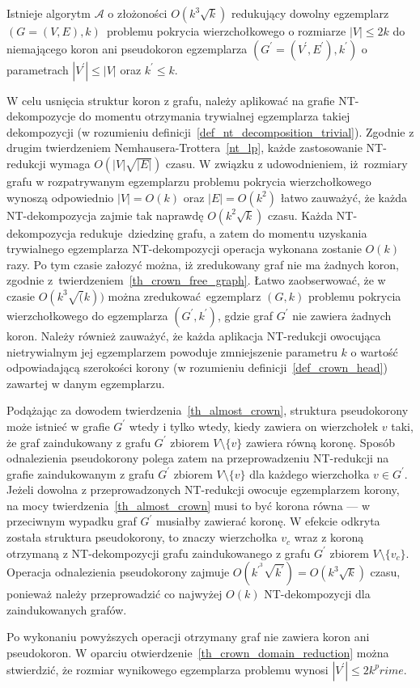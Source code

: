 {  \begin{theorem}
    Istnieje algorytm $\mathcal{A}$ o złożoności $O(k^3\sqrt{k})$ redukujący dowolny egzemplarz $(G=(V, E), k)$ problemu pokrycia wierzchołkowego o rozmiarze $|V|\leq 2k$ do niemającego koron ani pseudokoron egzemplarza $(G^\prime=(V^\prime, E^\prime), k^\prime)$ o parametrach $|V^\prime| \leq |V|$ oraz $k^\prime \leq k$.
  \end{theorem}
  \begin{bproof}
    W celu usnięcia struktur koron z grafu, należy aplikować na grafie NT-dekompozycje do momentu otrzymania trywialnej egzemplarza takiej dekompozycji (w rozumieniu definicji~\ref{def_nt_decomposition_trivial}).
    Zgodnie z drugim twierdzeniem Nemhausera-Trottera~\ref{nt_lp}, każde zastosowanie NT-redukcji wymaga $O(|V|\sqrt{|E|})$ czasu.
    W związku z udowodnieniem, iż rozmiary grafu w rozpatrywanym egzemplarzu problemu pokrycia wierzchołkowego wynoszą odpowiednio $|V|=O(k)$ oraz $|E|=O(k^2)$ łatwo zauważyć, że każda NT-dekompozycja zajmie tak naprawdę $O(k^2\sqrt{k})$ czasu.
    Każda NT-dekompozycja redukuje dziedzinę grafu, a zatem do momentu uzyskania trywialnego egzemplarza NT-dekompozycji operacja wykonana zostanie $O(k)$ razy.
    Po tym czasie załozyć można, iż zredukowany graf nie ma żadnych koron, zgodnie z~twierdzeniem~\ref{th_crown_free_graph}.
    Łatwo zaobserwować, że w czasie $O(k^3\sqrt(k))$ można zredukować egzemplarz $(G, k)$ problemu pokrycia wierzchołkowego do egzemplarza $(G^\prime, k^\prime)$, gdzie graf $G^\prime$ nie zawiera żadnych koron.
    Należy również zauważyć, że każda aplikacja NT-redukcji owocująca nietrywialnym jej egzemplarzem powoduje zmniejszenie parametru $k$ o wartość odpowiadającą szerokości korony (w rozumieniu definicji~\ref{def_crown_head}) zawartej w danym egzemplarzu.

    Podążając za dowodem twierdzenia~\ref{th_almost_crown}, struktura pseudokorony może istnieć w grafie $G^\prime$ wtedy i tylko wtedy, kiedy zawiera on wierzchołek $v$ taki, że graf zaindukowany z grafu $G^\prime$ zbiorem $V \setminus \{v\}$ zawiera równą koronę.
    Sposób odnalezienia pseudokorony polega zatem na przeprowadzeniu NT-redukcji na grafie zaindukowanym z grafu $G^\prime$ zbiorem $V \setminus \{v\}$ dla każdego wierzchołka $v \in G^\prime$.
    Jeżeli dowolna z przeprowadzonych NT-redukcji owocuje egzemplarzem korony, na mocy twierdzenia~\ref{th_almost_crown} musi to być korona równa --- w przeciwnym wypadku graf $G^\prime$ musiałby zawierać koronę.
    W efekcie odkryta została struktura pseudokorony, to znaczy wierzchołka $v_c$ wraz z koroną otrzymaną z NT-dekompozycji grafu zaindukowanego z grafu $G^\prime$ zbiorem $V \setminus \{v_c\}$.
    Operacja odnalezienia pseudokorony zajmuje $O(k^{\prime}^3\sqrt{k^\prime})=O(k^3\sqrt{k})$ czasu, ponieważ należy przeprowadzić co najwyżej $O(k)$ NT-dekompozycji dla zaindukowanych grafów.

    Po wykonaniu powyższych operacji otrzymany graf nie zawiera koron ani pseudokoron.
    W oparciu  otwierdzenie~\ref{th_crown_domain_reduction} można stwierdzić, że rozmiar wynikowego egzemplarza problemu wynosi $|V^\prime| \leq 2k^prime$.
  \end{bproof}
}
